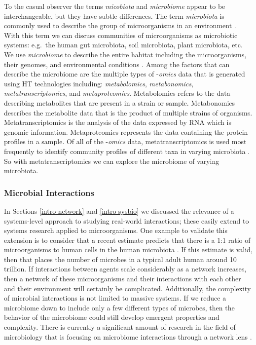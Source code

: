 To the casual observer the terms \textit{micobiota} and \textit{microbiome} appear to be interchangeable, but they have subtle differences. The term \textit{microbiota} is commonly used to describe the group of microorganisms in an environment \citep{Marchesi2015}. With this term we can discuss communities of microorganisms as microbiotic systems: e.g.\ the human gut microbiota, soil microbiota,  plant microbiota, etc. We use \textit{microbiome} to describe the entire habitat including the microorganisms, their genomes, and environmental conditions \citep{Marchesi2015}. Among the factors that can describe the microbiome are the multiple types of -\textit{omics} data that is generated using \acrshort{HT} technologies including: \textit{metabolomics}, \textit{metabonomics}, \textit{metatranscriptomics}, and \textit{metaproteomics}. Metabolomics refers to the data describing metabolites that are present in a strain or sample. Metabonomics describes the metabolite data that is the product of multiple strains of organisms. Metatranscriptomics is the analysis of the data expressed by \acrfull{RNA} which is genomic information. Metaproteomics represents the data containing the protein profiles in a sample. Of all of the -\textit{omics} data, metatranscriptomics is used most frequently to identify community profiles of different taxa in varying microbiota \citep{Knight2018}. So with metatranscriptomics we can explore the microbiome of varying microbiota. 

\subsubsection{Microbial Interactions}\label{intro-mic-def}
In Sections \ref{intro-network} and \ref{intro-sysbio} we discussed the relevance of a systems-level approach to studying real-world interactions; these easily extend to systems research applied to microorganisms. One example to validate this extension is to consider that a recent estimate predicts that there is a 1:1 ratio of microorganisms to human cells in the human microbiota \citep{Sender2016}. If this estimate is valid, then that places the number of microbes in a typical adult human around 10 trillion. If interactions between agents scale considerably as a network increases, then a network of these microorganisms and their interactions with each other and their environment will certainly be complicated. Additionally, the complexity of microbial interactions is not limited to massive systems. If we reduce a microbiome down to include only a few different types of microbes, then the behavior of the microbiome could still develop emergent properties and complexity. There is currently a significant amount of research in the field of microbiology that is focusing on microbiome interactions through a network lens \citep{Layeghifard2017}.

